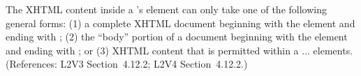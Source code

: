 The XHTML content inside a \Constraint's  element can only
take one of the following general forms: (1) a complete XHTML document
beginning with the element  and ending with ;
(2) the ``body'' portion of a document beginning with the element
 and ending with ; or (3) XHTML content that
is permitted within a  ...  elements.
(References: L2V3 Section~4.12.2; L2V4 Section~4.12.2.)
